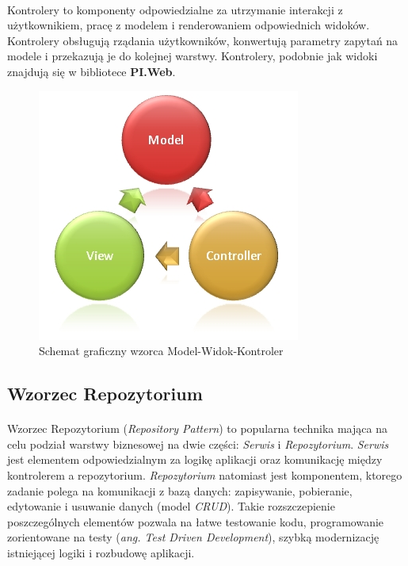 \paragraph{} 
Kontrolery to komponenty odpowiedzialne za utrzymanie interakcji z użytkownikiem, pracę z modelem i renderowaniem odpowiednich widoków. Kontrolery obsługują rządania użytkowników, konwertują parametry zapytań na modele i przekazują je do kolejnej warstwy. Kontrolery, podobnie jak widoki znajdują się w bibliotece \textbf{PI.Web}.  

\newpage
\begin{figure}[ht]
	\centering
		\includegraphics[width=0.5\linewidth]{assets/03_1.jpg}
	\caption{Schemat graficzny wzorca Model-Widok-Kontroler}
	\label{fig:mvc-pic}
\end{figure}

\subsection{Wzorzec Repozytorium} %
\label{sub:wzorzec_repozytorium}
\paragraph{} %
\label{par:}
Wzorzec Repozytorium (\textit{Repository Pattern}) to popularna technika mająca na celu podział warstwy biznesowej na dwie części: \textit{Serwis} i \textit{Repozytorium}. \textit{Serwis} jest elementem odpowiedzialnym za logikę aplikacji oraz komunikację między kontrolerem a repozytorium. \textit{Repozytorium} natomiast jest komponentem, ktorego zadanie polega na komunikacji z bazą danych: zapisywanie, pobieranie, edytowanie i usuwanie danych (model \textit{CRUD}). Takie rozszczepienie poszczególnych elementów pozwala na łatwe testowanie kodu, programowanie zorientowane na testy (\textit{ang. Test Driven Development}), szybką modernizację istniejącej logiki i rozbudowę aplikacji.

